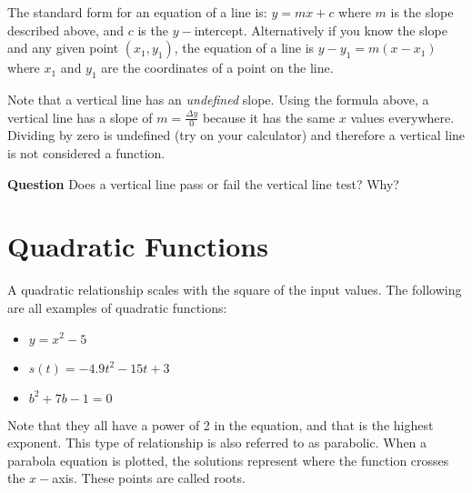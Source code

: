  
 The standard form for an equation of a line is: $y =m x +c$ where $m$ is the slope described above, and $c$ is the $y-$intercept. Alternatively if you know the slope and any given point $(x_1,y_1)$, the equation of a line is $y -y_{1} =m (x -x_{1})$ where $x_1$ and $y_1$ are the coordinates of a point on the line.

Note that a vertical line has an \textit{undefined} slope. Using the formula above, a vertical line has a slope of $m=\frac{\Delta y}{0}$ because it has the same $x$ values everywhere. Dividing by zero is undefined (try on your calculator) and therefore a vertical line is not considered a function.

\textbf{Question} Does a vertical line pass or fail the vertical line test? Why?\\

\section*{Quadratic Functions}
 A quadratic relationship scales with the square of the input values. The following are all examples of quadratic functions:
 \begin{itemize}
 	\item $ y=x^2-5$
 	\item $ s(t)=-4.9t^2-15t+3$
 	\item $ b^2+7b-1=0$
 \end{itemize}
Note that they all have a power of 2 in the equation, and that is the highest exponent. This type of relationship is also referred to as parabolic. When a parabola equation is plotted, the solutions represent where the function crosses the $x-$axis. These points are called roots.
 
